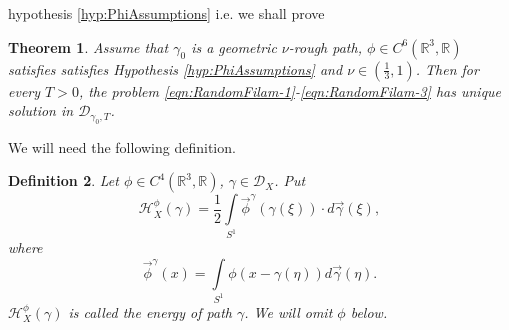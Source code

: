 \documentclass[11pt,a4paper,leqno]{amsart}%
\theoremstyle{plain}
\newtheorem{theorem}{Theorem}[section]
\theoremstyle{remark}
\theoremstyle{plain}
\newtheorem{definition}[theorem]{Definition}
\numberwithin{equation}{section}
\def\Rnu{{\mathbb R}}
\def\intl{\int\limits}
\begin{document}
hypothesis \ref{hyp:PhiAssumptions} i.e. we shall prove
\begin{theorem}\label{thm:GlobalExistUniq}
Assume that  $\gamma_0$ is a geometric $\nu$-rough path, $\phi\in
C^6(\Rnu^3,\Rnu)$ satisfies  satisfies Hypothesis
\ref{hyp:PhiAssumptions} and  $\nu\in(\frac{1}{3},1)$. Then for every $T>0$, the problem
\eqref{eqn:RandomFilam-1}-\eqref{eqn:RandomFilam-3} has unique
solution in $\mathcal{D}_{\gamma_0,T}$.
\end{theorem}
We will need the following definition.
\begin{definition}
Let $\phi\in C^4(\Rnu^3,\Rnu)$, $\gamma\in \mathcal{D}_X$. Put
\begin{equation}
\mathcal{H}_X^{\phi}(\gamma)=\frac{1}{2}\intl_{S^1}\vec{\phi}^{\gamma}(\gamma(\xi))\cdot
d\vec{\gamma}(\xi),\label{eqn:EnergyIntegralDef-1}
\end{equation}
where
\begin{equation*}
\vec{\phi}^{\gamma}(x)=\intl_{S^1}\phi(x-\gamma(\eta))d\vec{\gamma}(\eta).\label{eqn:EnergyIntegralDef-1a}
\end{equation*}
$\mathcal{H}_X^{\phi}(\gamma)$ is called the energy of path $\gamma$. We will omit $\phi$ below.
\end{definition}
\end{document}
